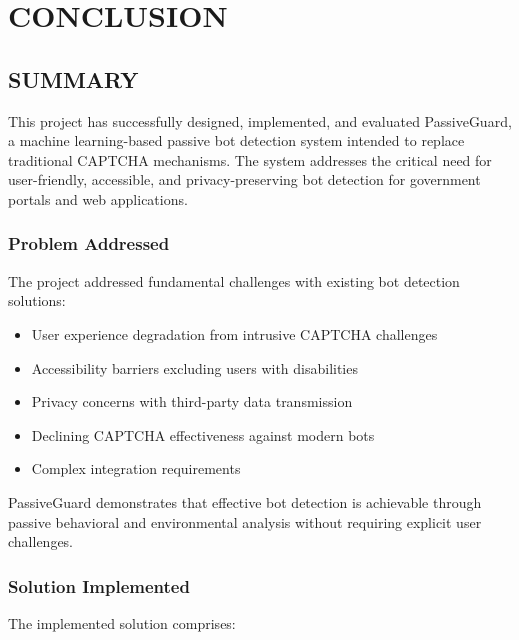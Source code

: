 
\chapter{CONCLUSION}

\section{SUMMARY}

This project has successfully designed, implemented, and evaluated PassiveGuard, a machine learning-based passive bot detection system intended to replace traditional CAPTCHA mechanisms. The system addresses the critical need for user-friendly, accessible, and privacy-preserving bot detection for government portals and web applications.

\subsection{Problem Addressed}

The project addressed fundamental challenges with existing bot detection solutions:
\begin{itemize}
    \item User experience degradation from intrusive CAPTCHA challenges
    \item Accessibility barriers excluding users with disabilities
    \item Privacy concerns with third-party data transmission
    \item Declining CAPTCHA effectiveness against modern bots
    \item Complex integration requirements
\end{itemize}

PassiveGuard demonstrates that effective bot detection is achievable through passive behavioral and environmental analysis without requiring explicit user challenges.

\subsection{Solution Implemented}

The implemented solution comprises:

